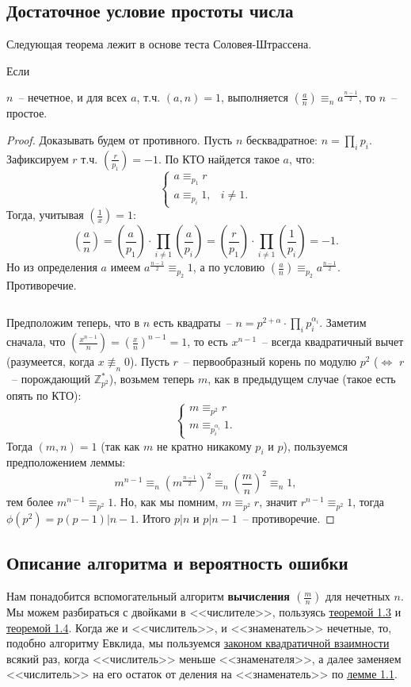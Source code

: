 \subsection{Достаточное условие простоты числа}
Следующая теорема лежит в основе теста Соловея-Штрассена.
\begin{theorem}\hypertarget{solovaytest}{Если} $n$~-- нечетное, и для всех $a$, т.ч. $(a,n)=1$, выполняется $(\frac{a}{n})\equiv_n a^\frac{n-1}{2}$, то $n$~-- простое.
\end{theorem}
\begin{proof}
Доказывать будем от противного.
Пусть $n$ бесквадратное: $n=\prod_i p_i$. Зафиксируем $r$ т.ч. $(\frac{r}{p_1})=-1$. По КТО найдется такое $a$, что: 
$$\begin{cases}
a\equiv_{p_1} r\\
a\equiv_{p_i} 1, & i\ne1. 
\end{cases}$$
Тогда, учитывая $(\frac{1}{x}) = 1$: $$(\frac{a}{n})=(\frac{a}{p_1})\cdot\prod_{i\ne1}(\frac{a}{p_i})=(\frac{r}{p_1})\cdot\prod_{i\ne1}(\frac{1}{p_i})=-1.$$ Но из определения $a$ имеем $a^\frac{n-1}{2}\equiv_{p_2}1$, а по условию $(\frac{a}{n})\equiv_{p_2} a^\frac{n-1}{2}$. Противоречие.

$ $

Предположим теперь, что в $n$ есть квадраты~-- $n=p^{2+\alpha}\cdot\prod_{i} p_i^{\alpha_i}$. 
Заметим сначала, что $(\frac{x^{n-1}}{n})=(\frac{x}{n})^{n-1}=1$, то есть $x^{n-1}$~-- всегда квадратичный вычет (разумеется, когда $x\not\equiv_n 0$).
Пусть $r$~-- первообразный корень по модулю $p^2$ ($\iff$ $r$~-- порождающий $\mathbb Z_{p^2}^*$), возьмем теперь $m$, как в предыдущем случае (такое есть опять по КТО): 
$$\begin{cases}
m\equiv_{p^2} r \\
m\equiv_{p_i^{\alpha_i}} 1.
\end{cases}$$ 
Тогда $(m,n)=1$ (так как $m$ не кратно никакому $p_i$ и $p$), пользуемся предположением леммы: 
$$m^{n-1}\equiv_n (m^\frac{n-1}{2})^2\equiv_n (\frac{m}{n})^2\equiv_n1,$$ тем более $m^{n-1}\equiv_{p^2}1$. Но, как мы помним, $m\equiv_{p^2}r$, значит $r^{n-1}\equiv_{p^2}1$, тогда \\$\phi(p^2)=p(p-1)|n-1$.
Итого $p|n$ и $p|n-1$~-- противоречие.
\end{proof}

\subsection{Описание алгоритма и вероятность ошибки}
Нам понадобится вспомогательный алгоритм \textbf{вычисления $(\frac{m}{n})$} для нечетных $n$. Мы можем разбираться с двойками в <<числителе>>, пользуясь \hyperlink{multiplicative}{теоремой 1.3} и \hyperlink{twojacobi}{теоремой 1.4}. Когда же и <<числитель>>, и <<знаменатель>> нечетные, то, подобно алгоритму Евклида, мы пользуемся \hyperlink{qreciproc}{законом квадратичной взаимности} всякий раз, когда <<числитель>> меньше <<знаменателя>>, а далее заменяем <<числитель>>  на его остаток от деления на <<знаменатель>> по \hyperlink{aequivb}{лемме 1.1}. 

